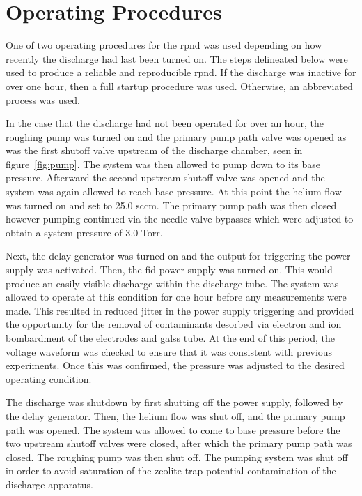 \section{Operating Procedures}

One of two operating procedures for the \acs{rpnd} was used depending on how
recently the discharge had last been turned on. The steps delineated below were
used to produce a reliable and reproducible \acs{rpnd}. If the discharge was
inactive for over one hour, then a full startup procedure was used. Otherwise,
an abbreviated process was used.

In the case that the discharge had not been operated for over an hour, the
roughing pump was turned on and the primary pump path valve was opened as was
the first shutoff valve upstream of the discharge chamber, seen in
figure~\ref{fig:pump}. The system was then allowed to pump down to its base
pressure. Afterward the second upstream shutoff valve was opened and the system
was again allowed to reach base pressure. At this point the helium flow was
turned on and set to 25.0 sccm. The primary pump path was then closed however
pumping continued via the needle valve bypasses which were adjusted to obtain a
system pressure of 3.0 Torr.

Next, the delay generator was turned on and the output for triggering the power
supply was activated. Then, the \acs{fid} power supply was turned on. This would
produce an easily visible discharge within the discharge tube. The system was
allowed to operate at this condition for one hour before any measurements were
made. This resulted in reduced jitter in the power supply triggering and
provided the opportunity for the removal of contaminants desorbed via electron
and ion bombardment of the electrodes and galss tube. At the end of this period,
the voltage waveform was checked to ensure that it was consistent with previous
experiments. Once this was confirmed, the pressure was adjusted to the desired
operating condition.

The discharge was shutdown by first shutting off the power supply, followed by
the delay generator. Then, the helium flow was shut off, and the primary pump
path was opened. The system was allowed to come to base pressure before the two
upstream shutoff valves were closed, after which the primary pump path was
closed. The roughing pump was then shut off. The pumping system was shut off in
order to avoid saturation of the zeolite trap potential contamination of the
discharge apparatus.

